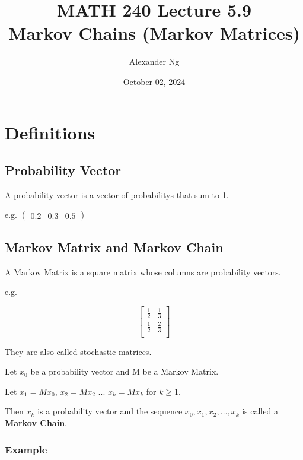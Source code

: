 \documentclass[12pt]{article}
\begin{document}
\renewcommand{\arraystretch}{1.5} %
\setlength{\arraycolsep}{12pt} 

\title{MATH 240 Lecture 5.9\\Markov Chains (Markov Matrices)}
\author{Alexander Ng}
\date{October 02, 2024}

\maketitle

\section{Definitions}

\subsection{Probability Vector}

A probability vector is a vector of probabilitys that sum to 1.

e.g. $\begin{pmatrix} 0.2 & 0.3 & 0.5 \end{pmatrix}$

\subsection{Markov Matrix and Markov Chain}

A Markov Matrix is a square matrix whose columns are probability vectors.

e.g.

\[
  \begin{bmatrix}
    \frac{1}{2} & \frac{1}{3} \\
    \frac{1}{2} & \frac{2}{3} \\
  \end{bmatrix}
\]

They are also called stochastic matrices.

Let $x_0$ be a probability vector and M be a Markov Matrix.

Let $x_1=Mx_0$, $x_2=Mx_2$ ... $x_k=Mx_k$ for $k \geq 1$.

Then $x_k$ is a probability vector and the sequence $x_0, x_1, x_2, \dots, x_k$
is called a \textbf{Markov Chain}.

\subsubsection*{Example}
\end{document}
